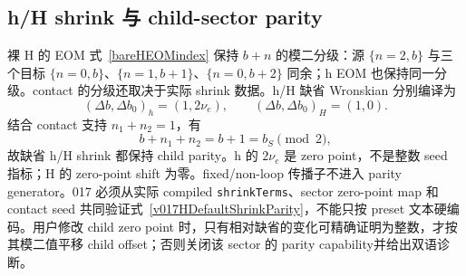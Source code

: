 ﻿\documentclass[a4paper,11pt]{article}
\begin{document}
\subsection{h/H shrink 与 child-sector parity}

裸 H 的 EOM 式~\eqref{bareHEOMindex} 保持 $b+n$ 的模二分级：源 $\{n=2,b\}$ 与三个目标 $\{n=0,b\}$、$\{n=1,b+1\}$、$\{n=0,b+2\}$ 同余；h EOM 也保持同一分级。contact 的分级还取决于实际 shrink 数据。h/H 缺省 Wronskian 分别编译为
\begin{equation}
 (\Delta b,\Delta b_0)_h=(1,2\nu_e),
 \qquad
 (\Delta b,\Delta b_0)_H=(1,0).
 \label{v017HDefaultShrinkParity}
\end{equation}
结合 contact 支持 $n_1+n_2=1$，有
\begin{equation}
 b+n_1+n_2=b+1=b_S\pmod 2,
 \label{v017HContactParity}
\end{equation}
故缺省 h/H shrink 都保持 child parity。h 的 $2\nu_e$ 是 zero point，不是整数 seed 指标；H 的 zero-point shift 为零。fixed/non-loop 传播子不进入 parity generator。017 必须从实际 compiled \texttt{shrinkTerms}、sector zero-point map 和 contact seed 共同验证式~\eqref{v017HDefaultShrinkParity}，不能只按 preset 文本硬编码。用户修改 child zero point 时，只有相对缺省的变化可精确证明为整数，才按其模二值平移 child offset；否则关闭该 sector 的 parity capability并给出双语诊断。
\end{document}
